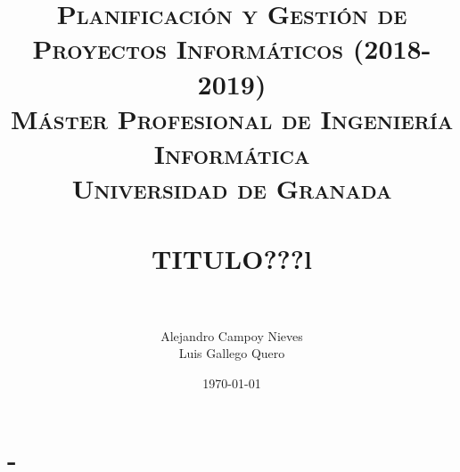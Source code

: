 

\title{	
	\normalfont \normalsize 
	\textsc{\textbf{Planificación y Gestión de Proyectos Informáticos (2018-2019)} \\ Máster Profesional de Ingeniería Informática \\ Universidad de Granada} \\ [25pt] %
	\horrule{0.5pt} \\[0.4cm] %
	\huge TITULO???l \\ %
	\horrule{2pt} \\[0.5cm] %
}

\author{Alejandro Campoy Nieves \\ Luis Gallego Quero} %
\date{\normalsize\today} %

\usepackage[spanish, es-tabla]{babel}
\usepackage{hyperref} %
\hypersetup{
	colorlinks=true,
	linkcolor=blue,
	filecolor=magenta,      
	urlcolor=blue,
}
\usepackage{graphicx}
\usepackage{amssymb, amsmath, amsbsy}
\usepackage{mathptmx}	
\usepackage{float}
\usepackage{booktabs}					%
\usepackage{eurosym}

\usepackage[table]{xcolor}
\usepackage{color}
\usepackage{colortbl}
\usepackage{multicol}
\usepackage{multirow}
\usepackage{booktabs}
\usepackage{tabularx}
\usepackage{array}
\usepackage{caption}
\usepackage{subcaption}




	\maketitle %
	
	\newpage %
	
	\tableofcontents %
	
	
	\listoftables	
	
	\newpage	
 
\section{-}



%
%

       

